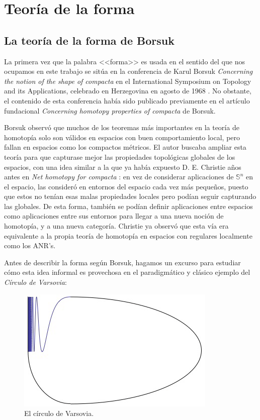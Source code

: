 \chapter{Teoría de la forma}\label{formahistorica}


\section{La teoría de la forma de Borsuk}

La primera vez que la palabra <<forma>> es usada en el sentido del que nos ocupamos en este trabajo se sitúa en la conferencia de Karul Borsuk \textit{Concerning the notion of the shape of compacta} en el International Symposium on Topology and its Applications, celebrado en Herzegovina en agosto de 1968 \cite{borsuk1969concerning}. No obstante, el contenido de esta conferencia había sido publicado previamente en el artículo fundacional \textit{Concerning homotopy properties of compacta} \cite{Borsuk_1968} de Borsuk.

Borsuk observó que muchos de los teoremas más importantes en la teoría de homotopía solo son válidos en espacios con buen comportamiento local, pero fallan en espacios como los compactos métricos. El autor buscaba ampliar esta teoría para que capturase mejor las propiedades topológicas globales de los espacios, con una idea similar a la que ya había expuesto D. E. Christie a\~nos antes en \textit{Net homotopy for compacta} \cite{christie1944net}: en vez de considerar aplicaciones de $ \mathbb{S}^n$ en el espacio, las consideró en entornos del espacio cada vez más peque\~nos, puesto que estos no tenían esas malas propiedades locales pero podían seguir capturando las globales. De esta forma, también se podían definir aplicaciones entre espacios como aplicaciones entre sus entornos para llegar a una nueva noción de homotopía, y a una nueva categoría. Christie ya observó que esta vía era equivalente a la propia teoría de homotopía en espacios con regulares localmente como los ANR's. 

Antes de describir la forma según Borsuk, hagamos un excurso para estudiar cómo esta idea informal es provechosa en el paradigmático y clásico ejemplo del \emph{Círculo de Varsovia}: 
\begin{figure}[h]
  \centering
  \includegraphics[scale = 0.8]{Warsaw-circle.png}
  \caption{El círculo de Varsovia.}
  \label{circulovarsovia}
\end{figure}

